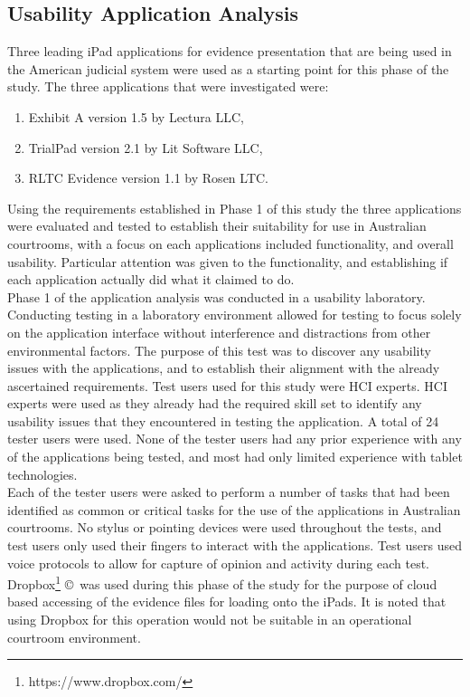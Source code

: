 \subsection{Usability Application Analysis\label{sec:UsabilityApplication Analysis}}
Three leading iPad applications for evidence presentation that are being used in the American judicial system were used as a starting point for this phase of the study. The three applications that were investigated were:
\begin{enumerate}
    \item Exhibit A version 1.5 by Lectura LLC,
    \item TrialPad version 2.1 by Lit Software LLC,
    \item RLTC Evidence version 1.1 by Rosen LTC.
\end{enumerate} 
Using the requirements established in Phase 1 of this study the three applications were evaluated and tested to establish their suitability for use in Australian courtrooms, with a focus on each applications included functionality, and overall usability. Particular attention was given to the functionality, and establishing if each application actually did what it claimed to do.\\
Phase 1 of the application analysis was conducted in a usability laboratory. Conducting testing in a laboratory environment allowed for testing to focus solely on the application interface without interference and distractions from other environmental factors.
The purpose of this test was to discover any usability issues with the applications, and to establish their alignment with the already ascertained requirements. Test users used for this study were HCI experts. HCI experts were used as they already had the required skill set to identify any usability issues that they encountered in testing the application. A total of 24 tester users were used. None of the tester users had any prior experience with any of the applications being tested, and most had only limited experience with tablet technologies.\\
Each of the tester users were asked to perform a number of tasks that had been identified as common or critical tasks for the use of the applications in Australian courtrooms. No stylus or pointing devices were used throughout the tests, and test users only used their fingers to interact with the applications. Test users used voice protocols to allow for capture of opinion and activity during each test. Dropbox\footnote{https://www.dropbox.com/} \copyright\   was used during this phase of the study for the purpose of cloud based accessing  of the  evidence files for loading onto the iPads. It is noted that using Dropbox for this operation would not be suitable in an operational courtroom environment.
